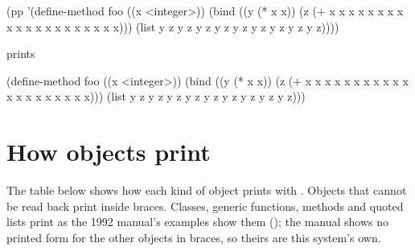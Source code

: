 \begin{dylan}
(pp '(define-method foo ((x <integer>))
       (bind ((y (* x x)) (z (+ x x x x x x x x x x x x x x x x x x x x)))
         (list y z y z y z y z y z y z y z y z y z))))
\end{dylan}

\noindent prints

\begin{dylan}
(define-method foo ((x <integer>))
  (bind ((y (* x x)) (z (+ x x x x x x x x x x x x x x x x x x x x)))
    (list y z y z y z y z y z y z y z y z y z)))
\end{dylan}

\section{How objects print}\label{sec:printing-classes}

The table below shows how each kind of object prints with .
Objects that cannot be read back print inside braces. Classes, generic
functions, methods and quoted lists print as the 1992 manual's examples
show them (); the manual shows no
printed form for the other objects in braces, so theirs are this
system's own.

